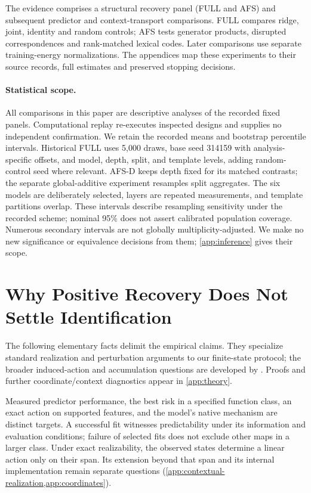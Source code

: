 \documentclass{article}
\begin{document}
The evidence comprises a structural recovery panel (FULL and AFS) and subsequent predictor and context-transport comparisons. FULL compares ridge, joint, identity and random controls; AFS tests generator products, disrupted correspondences and rank-matched lexical codes. Later comparisons use separate training-energy normalizations. The appendices map these experiments to their source records, full estimates and preserved stopping decisions.

\paragraph{Statistical scope.}
All comparisons in this paper are descriptive analyses of the recorded fixed panels. Computational replay re-executes inspected designs and supplies no independent confirmation. We retain the recorded means and bootstrap percentile intervals. Historical FULL uses 5,000 draws, base seed 314159 with analysis-specific offsets, and model, depth, split, and template levels, adding random-control seed where relevant. AFS-D keeps depth fixed for its matched contrasts; the separate global-additive experiment resamples split aggregates. The six models are deliberately selected, layers are repeated measurements, and template partitions overlap. These intervals describe resampling sensitivity under the recorded scheme; nominal 95\% does not assert calibrated population coverage. Numerous secondary intervals are not globally multiplicity-adjusted. We make no new significance or equivalence decisions from them; \cref{app:inference} gives their scope.

\section{Why Positive Recovery Does Not Settle Identification}
\label{sec:boundaries}
The following elementary facts delimit the empirical claims. They specialize standard realization and perturbation arguments to our finite-state protocol; the broader induced-action and accumulation questions are developed by \citet{sun2026transformationlaws}. Proofs and further coordinate/context diagnostics appear in \cref{app:theory}.

Measured predictor performance, the best risk in a specified function class, an exact action on supported features, and the model's native mechanism are distinct targets. A successful fit witnesses predictability under its information and evaluation conditions; failure of selected fits does not exclude other maps in a larger class. Under exact realizability, the observed states determine a linear action only on their span. Its extension beyond that span and its internal implementation remain separate questions (\cref{app:contextual-realization,app:coordinates}).
\end{document}
